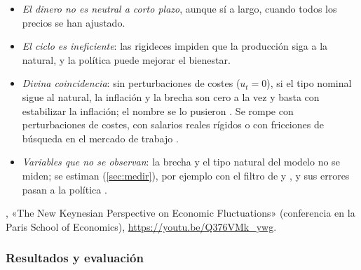 \documentclass[11pt]{article}
\begin{document}
\begin{itemize}
\item \emph{El dinero no es neutral a corto plazo}, aunque sí a largo, cuando todos los precios se han ajustado.
\item \emph{El ciclo es ineficiente}: las rigideces impiden que la producción siga a la natural, y la política puede mejorar el bienestar.
\item \emph{Divina coincidencia}: sin perturbaciones de costes ($u_t=0$), si el tipo nominal sigue al natural, la inflación y la brecha son cero a la vez y basta con estabilizar la inflación\nocite{GoodfriendKing1997New,RotembergWoodford1997Optimization}; el nombre se lo pusieron \textcite{BlanchardGali2007Real}. Se rompe con perturbaciones de costes, con salarios reales rígidos\nocite{BlanchardGali2007Real} o con fricciones de búsqueda en el mercado de trabajo\nocite{BlanchardGali2010Labor} .
\item \emph{Variables que no se observan}: la brecha y el tipo natural del modelo no se miden; se estiman (\ref{sec:medir}), por ejemplo con el filtro de \textcite{LaubachWilliams2003} y \textcite{HolstonLaubachWilliams2017Measuring}, y sus errores pasan a la política .
\end{itemize}

\begin{anotaciones}
, «The New Keynesian Perspective on Economic Fluctuations» (conferencia en la Paris School of Economics), \url{https://youtu.be/Q376VMk_ywg}.
\end{anotaciones}

\subsubsection{Resultados y evaluación}\label{sec:nek-resultados}
\end{document}
